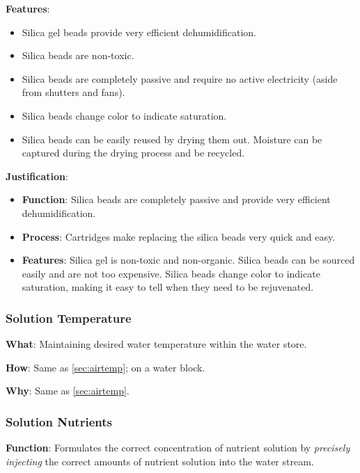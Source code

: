 \documentclass{report}
\begin{document}
\textbf{Features}:
\begin{itemize}
    \item Silica gel beads provide very efficient dehumidification.
    \item Silica beads are non-toxic.
    \item Silica beads are completely passive and require no active electricity (aside from shutters and fans).
    \item Silica beads change color to indicate saturation.
    \item Silica beads can be easily reused by drying them out. Moisture can be captured during the drying process and be recycled.
\end{itemize}

\textbf{Justification}: 
\begin{itemize}
    \item \textbf{Function}: Silica beads are completely passive and provide very efficient dehumidification.
    \item \textbf{Process}: Cartridges make replacing the silica beads very quick and easy. 
    \item \textbf{Features}: Silica gel is non-toxic and non-organic. Silica beads can be sourced easily and are not too expensive. Silica beads change color to indicate saturation, making it easy to tell when they need to be rejuvenated.
\end{itemize}

\newpage



\subsubsection{Solution Temperature}
\label{sec:watertemp}

\textbf{What}: Maintaining desired water temperature within the water store.

\textbf{How}: Same as \ref{sec:airtemp}; on a water block.

\textbf{Why}: Same as \ref{sec:airtemp}.

\subsubsection{Solution Nutrients}
\label{sec:nutrients}

\textbf{Function}: Formulates the correct concentration of nutrient solution by \textit{precisely injecting} the correct amounts of nutrient solution into the water stream.
\end{document}
